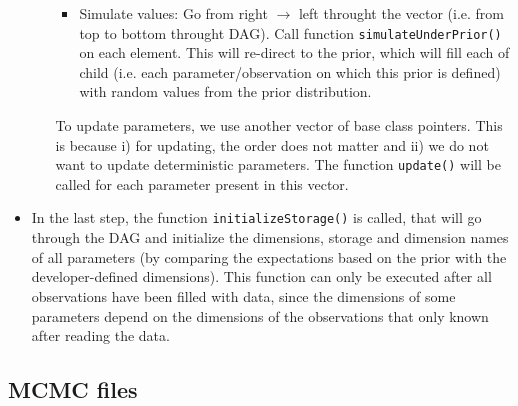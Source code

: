 \documentclass[a4paper,11pt]{article}
\newcommand{\pubfunc}[1]{\texttt{#1()}}
\begin{document}
\begin{itemize}
\begin{itemize}
\begin{itemize}
 \item Simulate values: Go from right $\to$ left throught the vector (i.e. from top to bottom throught DAG). Call function \pubfunc{simulateUnderPrior} on each element. This will re-direct to the prior, which will fill each of child (i.e. each parameter/observation on which this prior is defined) with random values from the prior distribution.
\end{itemize}
To update parameters, we use another vector of base class pointers. This is because i) for updating, the order does not matter and ii) we do not want to update deterministic parameters. The function \pubfunc{update} will be called for each parameter present in this vector.
 \end{itemize}
 \item In the last step, the function \pubfunc{initializeStorage} is called, that will go through the DAG and initialize the dimensions, storage and dimension names of all parameters (by comparing the expectations based on the prior with the developer-defined dimensions). This function can only be executed after all observations have been filled with data, since the dimensions of some parameters depend on the dimensions of the observations that only known after reading the data.
\end{itemize}

\subsection{MCMC files}
\end{document}
